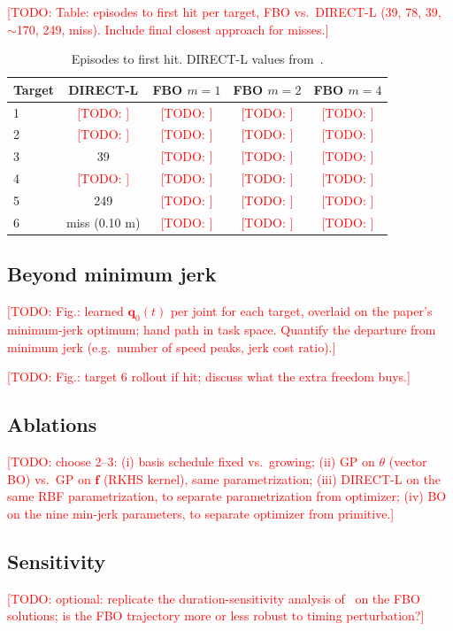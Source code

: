 \documentclass[letterpaper, 10 pt, conference]{ieeeconf}
\newcommand{\todo}[1]{\textcolor{red}{[TODO: #1]}}
\newcommand{\vq}{\mathbf{q}}
\newcommand{\vf}{\mathbf{f}}
\begin{document}
\todo{Table: episodes to first hit per target, FBO vs.\ DIRECT-L (39, 78, 39,
$\sim$170, 249, miss). Include final closest approach for misses.}

\begin{table}[t]
\caption{Episodes to first hit. DIRECT-L values from~\cite{nah2023whip}.}
\label{tab:episodes}
\centering
\begin{tabular}{lcccc}
\toprule
Target & DIRECT-L & FBO $m{=}1$ & FBO $m{=}2$ & FBO $m{=}4$ \\
\midrule
1 & \todo{} & \todo{} & \todo{} & \todo{} \\
2 & \todo{} & \todo{} & \todo{} & \todo{} \\
3 & 39 & \todo{} & \todo{} & \todo{} \\
4 & \todo{} & \todo{} & \todo{} & \todo{} \\
5 & 249 & \todo{} & \todo{} & \todo{} \\
6 & miss (0.10 m) & \todo{} & \todo{} & \todo{} \\
\bottomrule
\end{tabular}
\end{table}

\subsection{Beyond minimum jerk}
\todo{Fig.: learned $\vq_0(t)$ per joint for each target, overlaid on the
paper's minimum-jerk optimum; hand path in task space. Quantify the departure
from minimum jerk (e.g.\ number of speed peaks, jerk cost ratio).}

\todo{Fig.: target 6 rollout if hit; discuss what the extra freedom buys.}

\subsection{Ablations}
\todo{choose 2--3: (i) basis schedule fixed vs.\ growing; (ii) GP on
$\theta$ (vector BO) vs.\ GP on $\vf$ (RKHS kernel), same parametrization;
(iii) DIRECT-L on the same RBF parametrization, to separate parametrization
from optimizer; (iv) BO on the nine min-jerk parameters, to separate optimizer
from primitive.}

\subsection{Sensitivity}
\todo{optional: replicate the duration-sensitivity analysis of~\cite{nah2023whip}
on the FBO solutions; is the FBO trajectory more or less robust to timing
perturbation?}
\end{document}
